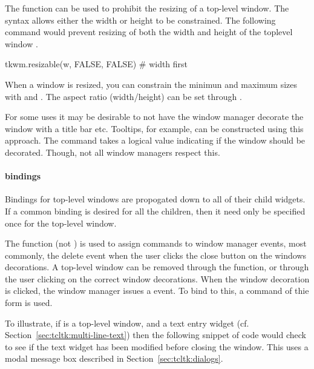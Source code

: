 The  function can be used to prohibit the
resizing of a top-level window. The syntax allows either the width or
height to be constrained. The following command would  prevent
resizing of both the width and height of the toplevel window . 

\begin{Schunk}
  \begin{Sinput}
tkwm.resizable(w, FALSE, FALSE)    # width first
  \end{Sinput}
\end{Schunk}

When a window is resized, you can constrain the minimun and maximum sizes with  and . The aspect ratio (width/height) can be set through .


For some uses it may be desirable to not have the window manager
decorate the window with a title bar etc. Tooltips, for example, can
be constructed using this approach. The command  takes a logical value
indicating if the window should be decorated. Though, not all window
managers respect this.



\paragraph{bindings}
Bindings for top-level windows are propogated down to all of their
child widgets. If a common binding is desired for all the children,
then it need only be specified once for the top-level window.


The  function (not ) is used
to assign commands to window manager events, most commonly, the delete
event when the user clicks the close button on the windows
decorations. A top-level window can be removed through the
 function, or through the user clicking on the
correct window decorations. When the window decoration is clicked, the
window manager issues a  event. To bind to
this, a command of thie form
 is used.

To illustrate, if  is a top-level window, and
 a text entry widget
(cf. Section~\ref{sec:tcltk:multi-line-text}) then the following
snippet of code would check to see if the text widget has been
modified before closing the window. This uses a modal message box
described in Section~\ref{sec:tcltk:dialogs}.



